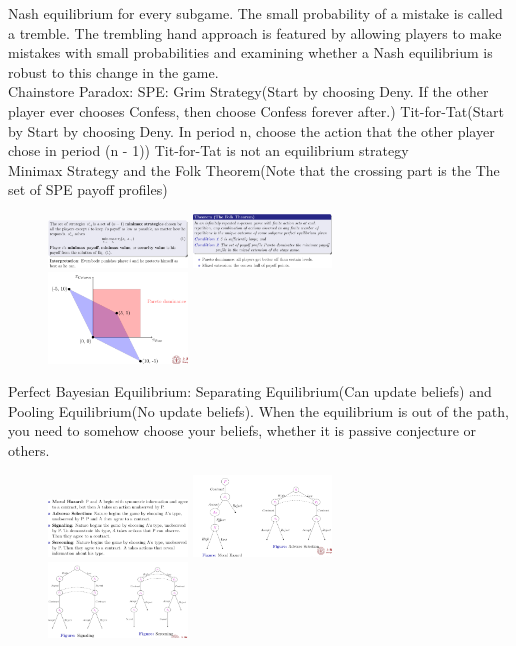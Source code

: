 \documentclass{article}
\begin{document}
Nash equilibrium for every subgame.
The small probability of a mistake is called a tremble. The trembling
hand approach is featured by allowing players to make mistakes with small
probabilities and examining whether a Nash equilibrium is robust to this
change in the game.\\
Chainstore Paradox: SPE: Grim Strategy(Start by choosing Deny. If the other player ever chooses Confess, then choose Confess forever after.) Tit-for-Tat(Start by Start by choosing Deny. In period n, choose the action that the other player chose in period (n - 1)) Tit-for-Tat is not an equilibrium strategy\\
Minimax Strategy and the Folk Theorem(Note that the crossing part is the The set of SPE payoff profiles)\\
\begin{figure}[H]
\includegraphics[width=0.33\textwidth]{minmax.png}
\includegraphics[width=0.33\textwidth]{Folk.png}
\includegraphics[width=0.33\textwidth]{pd.png}
\end{figure}
Perfect Bayesian Equilibrium: Separating Equilibrium(Can update beliefs) and Pooling Equilibrium(No update beliefs). When the equilibrium is out of the path, you need to somehow choose your beliefs, whether it is passive conjecture or others.\\
\begin{figure}[H]
    \includegraphics[width=0.33\textwidth]{moral.png}
    \includegraphics[width=0.33\textwidth]{moral2.png}
    \includegraphics[width=0.33\textwidth]{moral3.png}
\end{figure}
\end{document}
